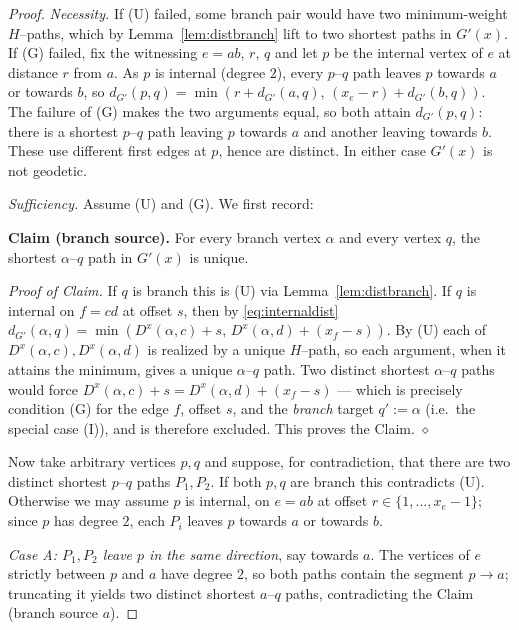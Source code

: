 \documentclass{amsart}
\theoremstyle{definition}
\begin{document}
\begin{proof}
\emph{Necessity.} If (U) failed, some branch pair would have two minimum-weight
$H$--paths, which by Lemma~\ref{lem:distbranch} lift to two shortest paths in
$G'(x)$. If (G) failed, fix the witnessing $e=ab$, $r$, $q$ and let $p$ be the
internal vertex of $e$ at distance $r$ from $a$. As $p$ is internal (degree $2$),
every $p$--$q$ path leaves $p$ towards $a$ or towards $b$, so
$d_{G'}(p,q)=\min(r+d_{G'}(a,q),\,(x_e-r)+d_{G'}(b,q))$. The failure of (G) makes
the two arguments equal, so both attain $d_{G'}(p,q)$: there is a shortest
$p$--$q$ path leaving $p$ towards $a$ and another leaving towards $b$. These use
different first edges at $p$, hence are distinct. In either case $G'(x)$ is not
geodetic.

\smallskip
\emph{Sufficiency.} Assume (U) and (G). We first record:

\smallskip
\noindent\textbf{Claim (branch source).} For every branch vertex $\alpha$ and
every vertex $q$, the shortest $\alpha$--$q$ path in $G'(x)$ is unique.

\noindent\emph{Proof of Claim.} If $q$ is branch this is (U) via
Lemma~\ref{lem:distbranch}. If $q$ is internal on $f=cd$ at offset $s$, then by
\eqref{eq:internaldist} $d_{G'}(\alpha,q)=\min(D^x(\alpha,c)+s,\,
D^x(\alpha,d)+(x_f-s))$. By (U) each of $D^x(\alpha,c),D^x(\alpha,d)$ is realized
by a unique $H$--path, so each argument, when it attains the minimum, gives a
unique $\alpha$--$q$ path. Two distinct shortest $\alpha$--$q$ paths would force
$D^x(\alpha,c)+s=D^x(\alpha,d)+(x_f-s)$ --- which is precisely condition (G) for
the edge $f$, offset $s$, and the \emph{branch} target $q':=\alpha$ (i.e.\ the
special case (I)), and is therefore excluded. This proves the Claim. \hfill$\diamond$

\smallskip
Now take arbitrary vertices $p,q$ and suppose, for contradiction, that there are
two distinct shortest $p$--$q$ paths $P_1,P_2$. If both $p,q$ are branch this
contradicts (U). Otherwise we may assume $p$ is internal, on $e=ab$ at offset
$r\in\{1,\dots,x_e-1\}$; since $p$ has degree $2$, each $P_i$ leaves $p$ towards
$a$ or towards $b$.

\emph{Case A: $P_1,P_2$ leave $p$ in the same direction}, say towards $a$. The
vertices of $e$ strictly between $p$ and $a$ have degree $2$, so both paths
contain the segment $p\to a$; truncating it yields two distinct shortest
$a$--$q$ paths, contradicting the Claim (branch source $a$).


\end{proof}
\end{document}
